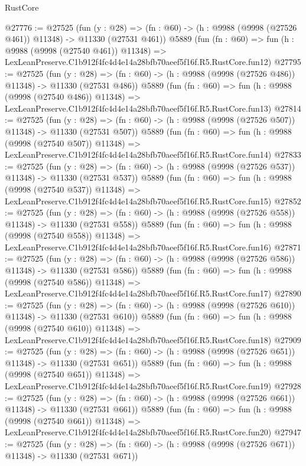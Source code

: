 \begin{lexlean}{RustCore}
\begin{coremodule}
@27776 := @27525
    (fun (y : @28) =>
    (fn : @60) -> (h : @9988 (@9998 (@27526 @461)) @11348) -> @11330 (@27531 @461))
    @5889
    (fun (fn : @60) =>
    fun (h : @9988 (@9998 (@27540 @461)) @11348) =>
    LexLeanPreserve.C1b912f4fc4d4e14a28bfb70aeef5f16f.R5.RustCore.fun12)
@27795 := @27525
    (fun (y : @28) =>
    (fn : @60) -> (h : @9988 (@9998 (@27526 @486)) @11348) -> @11330 (@27531 @486))
    @5889
    (fun (fn : @60) =>
    fun (h : @9988 (@9998 (@27540 @486)) @11348) =>
    LexLeanPreserve.C1b912f4fc4d4e14a28bfb70aeef5f16f.R5.RustCore.fun13)
@27814 := @27525
    (fun (y : @28) =>
    (fn : @60) -> (h : @9988 (@9998 (@27526 @507)) @11348) -> @11330 (@27531 @507))
    @5889
    (fun (fn : @60) =>
    fun (h : @9988 (@9998 (@27540 @507)) @11348) =>
    LexLeanPreserve.C1b912f4fc4d4e14a28bfb70aeef5f16f.R5.RustCore.fun14)
@27833 := @27525
    (fun (y : @28) =>
    (fn : @60) -> (h : @9988 (@9998 (@27526 @537)) @11348) -> @11330 (@27531 @537))
    @5889
    (fun (fn : @60) =>
    fun (h : @9988 (@9998 (@27540 @537)) @11348) =>
    LexLeanPreserve.C1b912f4fc4d4e14a28bfb70aeef5f16f.R5.RustCore.fun15)
@27852 := @27525
    (fun (y : @28) =>
    (fn : @60) -> (h : @9988 (@9998 (@27526 @558)) @11348) -> @11330 (@27531 @558))
    @5889
    (fun (fn : @60) =>
    fun (h : @9988 (@9998 (@27540 @558)) @11348) =>
    LexLeanPreserve.C1b912f4fc4d4e14a28bfb70aeef5f16f.R5.RustCore.fun16)
@27871 := @27525
    (fun (y : @28) =>
    (fn : @60) -> (h : @9988 (@9998 (@27526 @586)) @11348) -> @11330 (@27531 @586))
    @5889
    (fun (fn : @60) =>
    fun (h : @9988 (@9998 (@27540 @586)) @11348) =>
    LexLeanPreserve.C1b912f4fc4d4e14a28bfb70aeef5f16f.R5.RustCore.fun17)
@27890 := @27525
    (fun (y : @28) =>
    (fn : @60) -> (h : @9988 (@9998 (@27526 @610)) @11348) -> @11330 (@27531 @610))
    @5889
    (fun (fn : @60) =>
    fun (h : @9988 (@9998 (@27540 @610)) @11348) =>
    LexLeanPreserve.C1b912f4fc4d4e14a28bfb70aeef5f16f.R5.RustCore.fun18)
@27909 := @27525
    (fun (y : @28) =>
    (fn : @60) -> (h : @9988 (@9998 (@27526 @651)) @11348) -> @11330 (@27531 @651))
    @5889
    (fun (fn : @60) =>
    fun (h : @9988 (@9998 (@27540 @651)) @11348) =>
    LexLeanPreserve.C1b912f4fc4d4e14a28bfb70aeef5f16f.R5.RustCore.fun19)
@27928 := @27525
    (fun (y : @28) =>
    (fn : @60) -> (h : @9988 (@9998 (@27526 @661)) @11348) -> @11330 (@27531 @661))
    @5889
    (fun (fn : @60) =>
    fun (h : @9988 (@9998 (@27540 @661)) @11348) =>
    LexLeanPreserve.C1b912f4fc4d4e14a28bfb70aeef5f16f.R5.RustCore.fun20)
@27947 := @27525
    (fun (y : @28) =>
    (fn : @60) -> (h : @9988 (@9998 (@27526 @671)) @11348) -> @11330 (@27531 @671))

\end{coremodule}
\end{lexlean}
